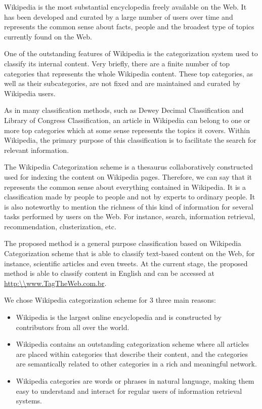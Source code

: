 Wikipedia is the most substantial encyclopedia freely available on the Web. It has been developed and curated by a large number of users over time and represents the common sense about facts, people and the broadest type of topics currently found on the Web.

One of the outstanding features of Wikipedia is the categorization system used to classify its internal content. Very briefly, there are a finite number of top categories that represents the whole Wikipedia content. These top categories, as well as their subcategories, are not fixed and are maintained and curated by Wikipedia users. 

As in many classification methods, such as Dewey Decimal Classification\cite{mitchell1996dewey} and Library of Congress Classification\cite{chan2016guide}, an article in Wikipedia can belong to one or more top categories which at some sense represents the topics it covers. Within Wikipedia, the primary purpose of this classification is to facilitate the search for relevant information.


The Wikipedia Categorization scheme is a thesaurus collaboratively constructed used for indexing the content on Wikipedia pages. \cite{voss2006collaborative} Therefore, we can say that it represents the common sense about everything contained in Wikipedia. It is a classification made by people to people and not by experts to ordinary people. It is also noteworthy to mention the richness of this kind of information for several tasks performed by users on the Web. For instance, search, information retrieval, recommendation, clusterization, etc. 

The proposed method is a general purpose classification based on Wikipedia Categorization scheme that is able to classify text-based content on the Web, for instance, scientific articles and even tweets. At the current stage, the proposed method is able to classify content in English and can be accessed at \url{http:\\www.TagTheWeb.com.br}.


We chose Wikipedia categorization scheme for 3 three main reasons: 

\begin{itemize}
\item  Wikipedia is the largest online encyclopedia and is constructed by contributors from all over the world.
\item Wikipedia contains an outstanding categorization scheme where all articles are placed within categories that describe their content, and the categories are semantically related to other categories in a rich and meaningful network.
\item Wikipedia categories are words or phrases in natural language, making them easy to understand and interact for regular users of information retrieval systems.
\end{itemize}


